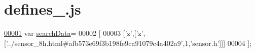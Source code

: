 \hypertarget{defines__15_8js_source}{}\section{defines\+\_.\+js}
\label{defines__15_8js_source}

\begin{DoxyCode}
\hypertarget{defines__15_8js_source.tex_l00001}{}\hyperlink{defines__15_8js_ad01a7523f103d6242ef9b0451861231e}{00001} var \hyperlink{defines__15_8js_ad01a7523f103d6242ef9b0451861231e}{searchData}=
00002 [
00003   [\textcolor{charliteral}{'z'},[\textcolor{charliteral}{'z'},[\textcolor{stringliteral}{'../sensor\_8h.html#afb573e69f3b198fe9ca91079c4a402a9'},1,\textcolor{stringliteral}{'sensor.h'}]]]
00004 ];
\end{DoxyCode}
